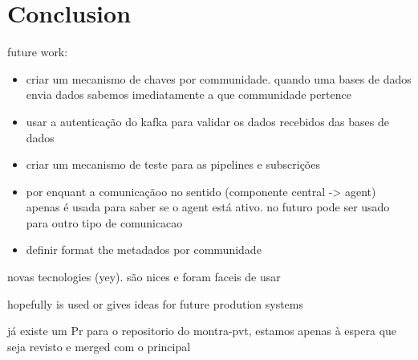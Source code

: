 \chapter{Conclusion}

future work:
\begin{itemize}
    \item criar um mecanismo de chaves por communidade. quando uma bases de dados envia dados sabemos imediatamente a que communidade pertence
    \item usar a autenticação do kafka para validar os dados recebidos das bases de dados
    \item criar um mecanismo de teste para as pipelines e subscrições
    \item por enquant a comunicaçãoo no sentido (componente central -> agent) apenas é usada para saber se o agent está ativo. no futuro pode ser usado para outro tipo de comunicacao
    \item definir format the metadados por communidade
\end{itemize}

novas tecnologies (yey). são nices e foram faceis de usar

hopefully is used or gives ideas for future prodution systems

já existe um Pr para o repositorio do montra-pvt, estamos apenas à espera que seja revisto e merged com o principal
